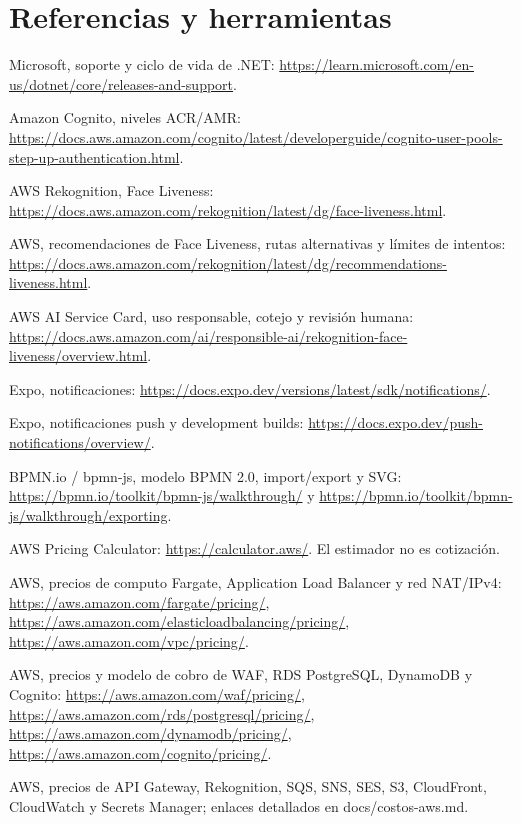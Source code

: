 \documentclass[11pt,a4paper]{report}
\begin{document}
\chapter*{Referencias y herramientas}
\begin{enumerate}[label={[\arabic*]}]
\sloppy
\item Microsoft, soporte y ciclo de vida de .NET: \url{https://learn.microsoft.com/en-us/dotnet/core/releases-and-support}.
\item Amazon Cognito, niveles ACR/AMR: \url{https://docs.aws.amazon.com/cognito/latest/developerguide/cognito-user-pools-step-up-authentication.html}.
\item AWS Rekognition, Face Liveness: \url{https://docs.aws.amazon.com/rekognition/latest/dg/face-liveness.html}.
\item AWS, recomendaciones de Face Liveness, rutas alternativas y límites de intentos: \url{https://docs.aws.amazon.com/rekognition/latest/dg/recommendations-liveness.html}.
\item AWS AI Service Card, uso responsable, cotejo y revisión humana: \url{https://docs.aws.amazon.com/ai/responsible-ai/rekognition-face-liveness/overview.html}.
\item Expo, notificaciones: \url{https://docs.expo.dev/versions/latest/sdk/notifications/}.
\item Expo, notificaciones push y development builds: \url{https://docs.expo.dev/push-notifications/overview/}.
\item BPMN.io / bpmn-js, modelo BPMN 2.0, import/export y SVG: \url{https://bpmn.io/toolkit/bpmn-js/walkthrough/} y \url{https://bpmn.io/toolkit/bpmn-js/walkthrough/exporting}.
\item AWS Pricing Calculator: \url{https://calculator.aws/}. El estimador no es cotización.
\item AWS, precios de computo Fargate, Application Load Balancer y red NAT/IPv4: \url{https://aws.amazon.com/fargate/pricing/}, \url{https://aws.amazon.com/elasticloadbalancing/pricing/}, \url{https://aws.amazon.com/vpc/pricing/}.
\item AWS, precios y modelo de cobro de WAF, RDS PostgreSQL, DynamoDB y Cognito: \url{https://aws.amazon.com/waf/pricing/}, \url{https://aws.amazon.com/rds/postgresql/pricing/}, \url{https://aws.amazon.com/dynamodb/pricing/}, \url{https://aws.amazon.com/cognito/pricing/}.
\item AWS, precios de API Gateway, Rekognition, SQS, SNS, SES, S3, CloudFront, CloudWatch y Secrets Manager; enlaces detallados en docs/costos-aws.md.

\end{enumerate}
\end{document}
